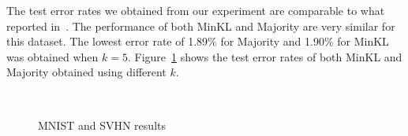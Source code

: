 \documentclass{article}
\begin{document}
The test error rates we obtained from our experiment are comparable to
what reported in~\cite{Lecun1998}. The performance of both MinKL and
Majority are very similar for this dataset. The lowest error rate of 1.89\% for
Majority and 1.90\% for MinKL was obtained when $k = 5$.
Figure~\ref{fig:mnist-svhn-results} shows the test error rates of
both MinKL and Majority obtained using different $k$. 

\begin{figure}[ht]
\vskip 0.2in
\begin{center}
\centering
{}\\
\caption{MNIST and SVHN results}
\label{fig:mnist-svhn-results}
\end{center}
\vskip -0.2in
\end{figure}
\end{document}
